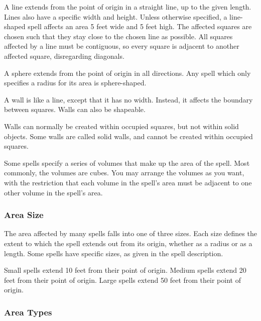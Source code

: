              A line extends from the point of origin in a straight line, up to the given length.
            Lines also have a specific width and height.
            Unless otherwise specified, a line-shaped spell affects an area 5 feet wide and 5 feet high.
            The affected squares are chosen such that they stay close to the chosen line as possible.
            All squares affected by a line must be contiguous, so every square is adjacent to another affected square, disregarding diagonals.

             A sphere extends from the point of origin in all directions.
            Any spell which only specifies a radius for its area is sphere-shaped.

             A wall is like a line, except that it has no width.
            Instead, it affects the boundary between squares.
            Walls can also be shapeable.

            Walls can normally be created within occupied squares, but not within solid objects.
            Some walls are called solid walls, and cannot be created within occupied squares.

             Some spells specify a series of volumes that make up the area of the spell.
            Most commonly, the volumes are cubes.
            You may arrange the volumes as you want, with the restriction that each volume in the spell's area must be adjacent to one other volume in the spell's area.

        \subsubsection{Area Size}

            The area affected by many spells falls into one of three sizes.
            Each size defines the extent to which the spell extends out from its origin, whether as a radius or as a length.
            Some spells have specific sizes, as given in the spell description.

             Small spells extend 10 feet from their point of origin.
             Medium spells extend 20 feet from their point of origin.
             Large spells extend 50 feet from their point of origin.

        \subsubsection{Area Types}\label{Area Types}

